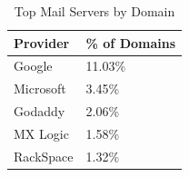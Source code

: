 \begin{table}
    \caption{Top Mail Servers by Domain}
    \centering
    \label{table:top_servers}
    \begin{tabular}{|l|l|}
        \hline
        Provider & \% of Domains \\
        \hline
        Google & 11.03\% \\
        Microsoft & 3.45\% \\ 
        Godaddy & 2.06\% \\
        MX Logic & 1.58\% \\
        RackSpace & 1.32\% \\
        \hline
    \end{tabular}
\end{table}

